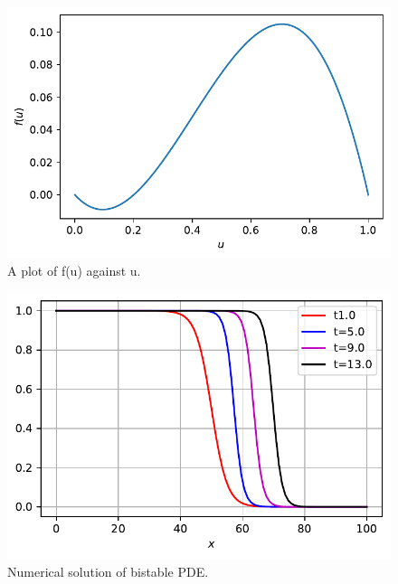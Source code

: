\documentclass[
  letterpaper,
  DIV=11,
  numbers=noendperiod]{scrreprt}
\theoremstyle{plain}
\theoremstyle{definition}
\theoremstyle{plain}
\theoremstyle{remark}
\begin{document}
\begin{figure}[H]

{\centering \includegraphics{nonlinearreactiondiffusion_files/figure-pdf/fig-bistablepde-output-1.pdf}

}

\caption{\label{fig-bistablepde}A plot of f(u) against u.}

\end{figure}

\begin{figure}[H]

{\centering \includegraphics{nonlinearreactiondiffusion_files/figure-pdf/fig-bistablepde-output-2.pdf}

}

\caption{\label{fig-bistablepde}Numerical solution of bistable PDE.}

\end{figure}
\end{document}
